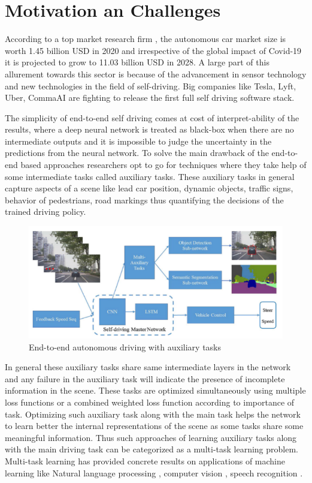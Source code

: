     \section{Motivation an Challenges}
    According to a top market research firm \cite{market_survey}, the autonomous car market size is worth 1.45 billion USD in 2020 and irrespective of the global impact of Covid-19 it is projected to grow to 11.03 billion USD in 2028. A large part of this allurement towards this sector is because of the advancement in sensor technology and new technologies in the field of self-driving. Big companies like Tesla, Lyft, Uber, CommaAI are fighting to release the first full self driving software stack. 
\par The simplicity of end-to-end self driving comes at cost of interpret-ability of the results, where a deep neural network is treated as black-box when there are no intermediate outputs and it is impossible to judge the uncertainty in the predictions from the neural network. To solve the main drawback of the end-to-end based approaches researchers opt to go for techniques where they take help of some intermediate tasks called auxiliary tasks. These auxiliary tasks in general capture aspects of a scene like lead car position, dynamic objects, traffic signs, behavior of pedestrians, road markings thus quantifying the decisions of the trained driving policy. 

 \begin{figure}[h]
    \centering
    \includegraphics[width=\textwidth]{images/motivation.png}
    \caption{End-to-end autonomous driving with auxiliary tasks \cite{Wang2019EndtoEndSU}}
\end{figure}

\par In general these auxiliary tasks share same intermediate layers in the network and any failure in the auxiliary task will indicate the presence of incomplete information in the scene. These tasks are optimized simultaneously using multiple loss functions or a combined weighted loss function according to importance of task. Optimizing such auxiliary task along with the main task helps the network to learn better the internal representations of the scene as some tasks share some meaningful information. Thus such approaches of learning auxiliary tasks along with the main driving task can be categorized as a multi-task learning problem. Multi-task learning has provided concrete results on applications of machine learning like Natural language processing \cite{nlp}, computer vision \cite{DBLP:journals/corr/abs-2002-05347}, speech recognition \cite{qiu2021multitask}.     

